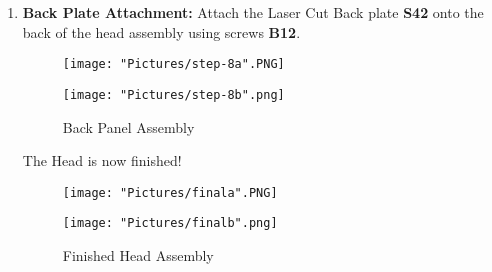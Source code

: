 \documentclass[12pt]{article}
\begin{document}
\begin{enumerate}
\item \textbf{Back Plate Attachment:} Attach the Laser Cut Back plate \textbf{S42} onto the back of the head assembly using screws \textbf{B12}.

\begin{figure}[H]
	\centering
  	\begin{minipage}[b]{0.45\textwidth}
		\texttt{[image: "Pictures/step-8a".PNG]}
  	\end{minipage}
  	\hfill
  	\begin{minipage}[b]{0.45\textwidth}
    		\texttt{[image: "Pictures/step-8b".png]}
  	\end{minipage}
  	\caption{Back Panel Assembly}
\end{figure}


The Head is now finished!

\begin{figure}[H]
	\centering
  	\begin{minipage}[b]{0.45\textwidth}
		\texttt{[image: "Pictures/finala".PNG]}
  	\end{minipage}
  	\hfill
  	\begin{minipage}[b]{0.45\textwidth}
    		\texttt{[image: "Pictures/finalb".png]}
  	\end{minipage}
  	\caption{Finished Head Assembly}
\end{figure}

\end{enumerate}
\end{document}
